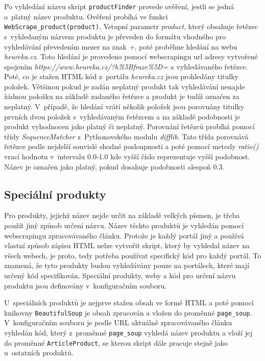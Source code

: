 Po vyhledání názvu skript \verb|productFinder| provede ověření, jestli se jedná o~platný název produktu. Ověření probíhá ve funkci \verb|WebScrape_product(product)|. Vstupní parametr \textit{product}, který obsahuje řetězec s~vyhledaným názvem produktu je převeden do formátu vhodného pro vyhledávání převedením mezer na znak \textit{+}, poté proběhne hledání na webu \textit{heureka.cz}. Toto hledání je provedeno pomocí webscrapingu url adresy vytvořené spojením \textit{https://www.heureka.cz/?h\%5Bfraze\%5D=} a vyhledávaného řetězce. Poté, co je stažen HTML kód z~portálu \textit{heureka.cz} jsou prohledány titulky položek. Většinou pokud je zadán neplatný produkt tak vyhledávání nenajde žádnou položku na základě zadaného řetězce a produkt je tudíž označen za neplatný. V~případě, že hledání vrátí několik položek jsou porovnány titulky prvních dvou položek s~vyhledávaným řetězcem a na základě podobnosti je produkt vyhodnocen jako platný či neplatný. Porovnání řetězců probíhá pomocí třídy \textit{SequenceMatcher} z~Pythonovského modulu \textit{difflib}. Tato třída porovnává řetězce podle nejdelší souvislé shodné posloupnosti a poté pomocí metody \textit{ratio()} vrací hodnotu v~intervalu 0.0-1.0 kde vyšší číslo reprezentuje vyšší podobnost. Název je označen jako platný, pokud dosahuje podobnosti alespoň 0.3.

\subsection*{Speciální produkty}
Pro produkty, jejichž název nejde určit na základě velkých písmen, je třeba použít jiný způsob určení názvu. Název těchto produktů je vyhledán pomocí webscrapingu zpracovávaného článku. Protože je každý portál jiný a používá vlastní způsob zápisu HTML nelze vytvořit skript, který by vyhledal název na všech webech, je proto, tedy potřeba používat specifický kód pro každý portál. To znamená, že tyto produkty budou vyhledávány pouze na portálech, které mají určený kód specifikován. Speciální produkty, weby a kód pro určení názvu produktu jsou definovány v~konfiguračním souboru.

U~speciálních produktů je nejprve stažen obsah ve formě HTML a poté pomocí knihovny \verb|BeautifulSoup| je obsah zpracován a vložen do proměnné \verb|page_soup|. V~konfiguračním souboru je podle URL aktuálně zpracovávaného článku vyhledán kód, který z~proměnné \verb|page_soup| vyhledá název produktu a vloží jej do proměnné \verb|ArticleProduct|, se kterou skript dále pracuje stejně jako u~ostatních produktů.

